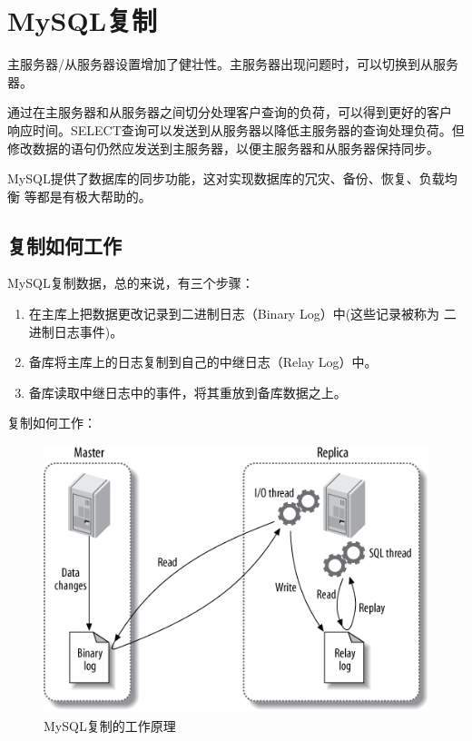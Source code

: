 \chapter{MySQL复制}

主服务器/从服务器设置增加了健壮性。主服务器出现问题时，可以切换到从服务
器。

通过在主服务器和从服务器之间切分处理客户查询的负荷，可以得到更好的客户
响应时间。SELECT查询可以发送到从服务器以降低主服务器的查询处理负荷。但
修改数据的语句仍然应发送到主服务器，以便主服务器和从服务器保持同步。

MySQL提供了数据库的同步功能，这对实现数据库的冗灾、备份、恢复、负载均衡
等都是有极大帮助的。

\section{复制如何工作}

MySQL复制数据，总的来说，有三个步骤：

\begin{enumerate}[itemsep=0pt,parsep=0pt]
\item 在主库上把数据更改记录到二进制日志（Binary Log）中(这些记录被称为
  二进制日志事件)。
\item 备库将主库上的日志复制到自己的中继日志（Relay Log）中。
\item 备库读取中继日志中的事件，将其重放到备库数据之上。
\end{enumerate}

复制如何工作：
\begin{figure}[!h]
\centering
\includegraphics{graph/mysql_replication_works}
\caption{MySQL复制的工作原理}
\label{fig:mysqlReplicationWorks}
\end{figure}


